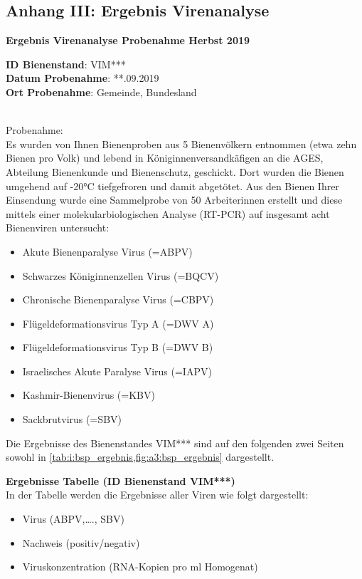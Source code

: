 \subsection{Anhang III: Ergebnis Virenanalyse}
\label{chap:anhang_Ergebnis}

\textbf{Ergebnis Virenanalyse Probenahme Herbst 2019}

\textbf{ID Bienenstand}: VIM***\\
\textbf{Datum Probenahme}: **.09.2019\\
\textbf{Ort Probenahme}: Gemeinde, Bundesland\\\

Probenahme:\\
Es wurden von Ihnen Bienenproben aus 5 Bienenvölkern entnommen (etwa zehn Bienen pro
Volk) und lebend in Königinnenversandkäfigen an die AGES, Abteilung Bienenkunde und
Bienenschutz, geschickt. Dort wurden die Bienen umgehend auf -20°C tiefgefroren und damit
abgetötet. Aus den Bienen Ihrer Einsendung wurde eine Sammelprobe von 50 Arbeiterinnen
erstellt und diese mittels einer molekularbiologischen Analyse (RT-PCR) auf insgesamt acht
Bienenviren untersucht:

\begin{itemize}
    \item Akute Bienenparalyse Virus (=ABPV)
    \item Schwarzes Königinnenzellen Virus (=BQCV)
    \item Chronische Bienenparalyse Virus (=CBPV)
    \item Flügeldeformationsvirus Typ A (=DWV A)
    \item Flügeldeformationsvirus Typ B (=DWV B)
    \item Israelisches Akute Paralyse Virus (=IAPV)
    \item Kashmir-Bienenvirus (=KBV)
    \item Sackbrutvirus (=SBV)
\end{itemize}

Die Ergebnisse des Bienenstandes VIM*** sind auf den folgenden zwei Seiten sowohl in \cref{tab:i:bsp_ergebnis,fig:a3:bsp_ergebnis} dargestellt.

\textbf{Ergebnisse Tabelle (ID Bienenstand VIM***)}\\
In der Tabelle werden die Ergebnisse aller Viren wie folgt dargestellt:
\begin{itemize}
    \item Virus (ABPV,…., SBV)
    \item Nachweis (positiv/negativ)
    \item Viruskonzentration (RNA-Kopien pro ml Homogenat)
\end{itemize}


